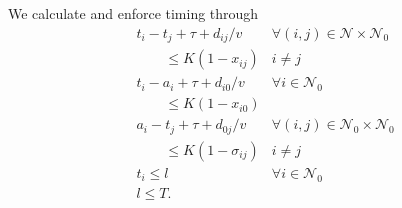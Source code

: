 \documentclass[journal]{IEEEtran}
\begin{document}
We calculate and enforce timing through
\begin{subequations}
\label{eq:timing-constraints}
\begin{align}
& {\ensuremath{t_{{i}}}} - {\ensuremath{t_{{j}}}} + {\ensuremath{\tau}} + {\ensuremath{d_{{i} {j}}}}/{\ensuremath{v}} & {\ensuremath{\forall({i},{j}) \in {\ensuremath{\mathcal{N}}} \times {\ensuremath{{\ensuremath{\mathcal{N}}}_{0}}}}} \label{eq:count-time} \\
& \qquad \leq {\ensuremath{{\ensuremath{K}} \left(1 - {\ensuremath{x_{{{i}} {{j}}}}}\right) }} & i \neq j \nonumber \\
& {\ensuremath{t_{{i}}}} - {\ensuremath{a_{{i}}}} + {\ensuremath{\tau}} + {\ensuremath{d_{{i} {0}}}}/{\ensuremath{v}} & {\ensuremath{\forall {i} \in {\ensuremath{{\ensuremath{\mathcal{N}}}_{0}}}}} \label{eq:count-route-time} \\
& \qquad \leq {\ensuremath{{\ensuremath{K}} \left(1 - {\ensuremath{x_{{{i}} {{0}}}}}\right) }} & \nonumber \\
& {\ensuremath{a_{{i}}}} - {\ensuremath{t_{{j}}}} + {\ensuremath{\tau}} + {\ensuremath{d_{{0} {j}}}}/{\ensuremath{v}} & {\ensuremath{\forall({i},{j}) \in {\ensuremath{{\ensuremath{\mathcal{N}}}_{0}}} \times {\ensuremath{{\ensuremath{\mathcal{N}}}_{0}}}}} \label{eq:connect-route-times} \\
& \qquad \leq {\ensuremath{K}} \left(1 - {\ensuremath{\sigma_{{i} {j}}}}\right) & i \neq j \nonumber \\
& {\ensuremath{t_{{i}}}} \leq {\ensuremath{l}} & {\ensuremath{\forall {i} \in {\ensuremath{{\ensuremath{\mathcal{N}}}_{0}}}}} \label{eq:total-time} \\
& {\ensuremath{l}} \leq {\ensuremath{T}}. \label{eq:constrain-time}
\end{align}
\end{subequations}
\end{document}
